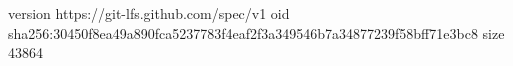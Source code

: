 version https://git-lfs.github.com/spec/v1
oid sha256:30450f8ea49a890fca5237783f4eaf2f3a349546b7a34877239f58bff71e3bc8
size 43864

